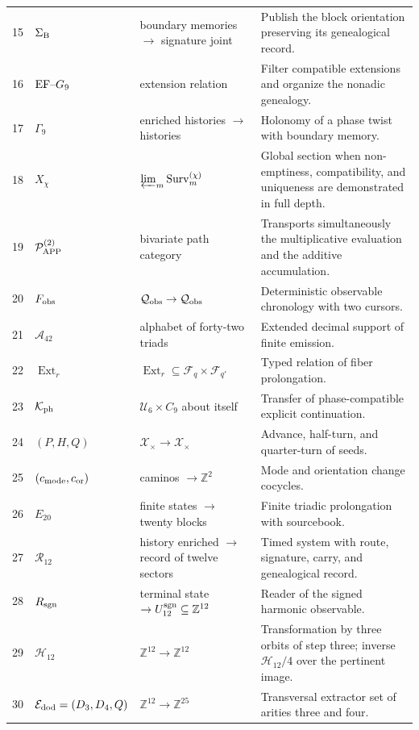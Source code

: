 {\begin{longtable}{@{}r p{}p{}p{}@{}}
15&\(\Sigma_{\rm B}\)&boundary memories \(\to\) signature joint&
Publish the block orientation preserving its genealogical record.\\
16&\({\rm EF}\text{--}G_9\)&extension relation&
Filter compatible extensions and organize the nonadic genealogy.\\
17&\(\Gamma_9\)&enriched histories \(\longrightarrow\) histories&
Holonomy of a phase twist with boundary memory.\\
18&\(X_\chi\)&\(\varprojlim_m\operatorname{Surv}^{(\chi)}_m\)&
Global section when non-emptiness, compatibility, and uniqueness are demonstrated in full depth.\\
19&\(\mathcal P_{\rm APP}^{(2)}\)&bivariate path category&
Transports simultaneously the multiplicative evaluation and the additive accumulation.\\
20&\(F_{\rm obs}\)&\(\mathcal Q_{\rm obs}\to\mathcal Q_{\rm obs}\)&
Deterministic observable chronology with two cursors.\\
21&\(\mathcal A_{42}\)&alphabet of forty-two triads&
Extended decimal support of finite emission.\\
22&\(\operatorname{Ext}_r\)&
\(\operatorname{Ext}_r\subseteq\mathcal F_q\times\mathcal F_{q'}\)&
Typed relation of fiber prolongation.\\
23&\(\mathcal K_{\rm ph}\)&\(\mathcal U_6\times C_9\) about itself&
Transfer of phase-compatible explicit continuation.\\
24&\((P,H,Q)\)&\(\mathcal X_\times\to\mathcal X_\times\)&
Advance, half-turn, and quarter-turn of seeds.\\
25&\((c_{\rm mode},c_{\rm or})\)&caminos \(\to\mathbb Z^2\)&
Mode and orientation change cocycles.\\
26&\(E_{20}\)&finite states \(\to\) twenty blocks&
Finite triadic prolongation with sourcebook.\\
27&\(\mathcal R_{12}\)&history enriched \(\to\) record of twelve
sectors&
Timed system with route, signature, carry, and genealogical record.\\
28&\(R_{\rm sgn}\)&terminal state \(\to U_{12}^{\rm sgn}
\subseteq\mathbb Z^{12}\)&
Reader of the signed harmonic observable.\\
29&\(\mathcal H_{12}\)&\(\mathbb Z^{12}\to\mathbb Z^{12}\)&
Transformation by three orbits of step three; inverse
\(\mathcal H_{12}/4\) over the pertinent image.\\
30&\(\mathcal E_{\rm dod}=(D_3,D_4,Q)\)&
\(\mathbb Z^{12}\to\mathbb Z^{25}\)&
Transversal extractor set of arities three and four.\\

\end{longtable}}
